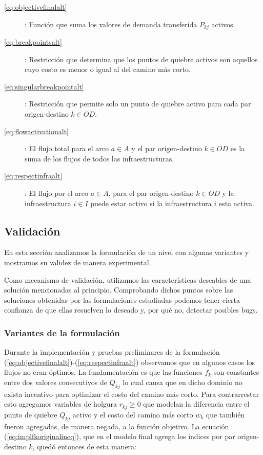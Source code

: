 \documentclass{article}
\begin{document}
  \begin{description}
    \item[\ref{eq:objectivefinalalt}]: Función que suma los valores de demanda transferida $P_{kj}$ activos.
    \item[\ref{eq:breakpointsalt}]: Restricción que determina que los puntos de quiebre activos son aquellos cuyo costo es menor o igual al del camino más corto.
    \item[\ref{eq:singularbreakpointalt}]: Restricción que permite solo un punto de quiebre activo para cada par origen-destino $k \in OD$.
    \item[\ref{eq:flowactivationalt}]: El flujo total para el arco $a \in A$ y el par origen-destino $k \in OD$ es la suma de los flujos de todos las infraestructuras.
    \item[\ref{eq:respectinfraalt}]: El flujo por el arco $a \in A$, para el par origen-destino $k \in OD$ y la infraestructura $i \in I$ puede estar activo si la infraestructura $i$ esta activa.
  \end{description}

  \subsection{Validación}

  En esta sección analizamos la formulación de un nivel con algunas variantes y mostramos su validez de manera experimental.

  Como mecanismo de validación, utilizamos las características deseables de una solución mencionadas al principio. Comprobando dichos puntos sobre las soluciones obtenidas por las formulaciones estudiadas podemos tener cierta confianza de que ellas resuelven lo deseado y, por qué no, detectar posibles bugs.

  \subsubsection{Variantes de la formulación}

  Durante la implementación y pruebas preliminares de la formulación (\ref{eq:objectivefinalalt})-(\ref{eq:respectinfraalt}) observamos que en algunos casos los flujos no eran óptimos. La fundamentación es que las funciones $f_k$ son constantes entre dos valores consecutivos de $Q_{kj}$ lo cual causa que en dicho dominio no exista incentivo para optimizar el costo del camino más corto. Para contrarrestar esto agregamos variables de holgura $r_{kj} \geq 0$ que modelan la diferencia entre el punto de quiebre $Q_{kj}$ activo y el costo del camino más corto $w_k$ que también fueron agregadas, de manera negada, a la función objetivo. La ecuación (\ref{eq:implfkoriginalineq}), que en el modelo final agrega los indices por par origen-destino $k$, quedó entonces de esta manera:
\end{document}
